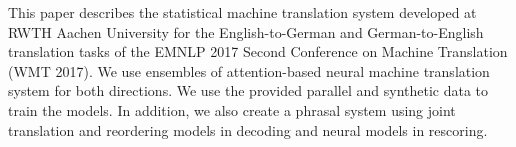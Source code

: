 This paper describes the statistical machine translation system developed at RWTH Aachen University for the English-to-German and German-to-English translation tasks of the EMNLP 2017 Second Conference on Machine Translation (WMT 2017). We use ensembles of attention-based neural machine translation system for both directions. We use the provided parallel and synthetic data to train the models. In addition, we also create a phrasal system using joint translation and reordering models in decoding and neural models in rescoring.
